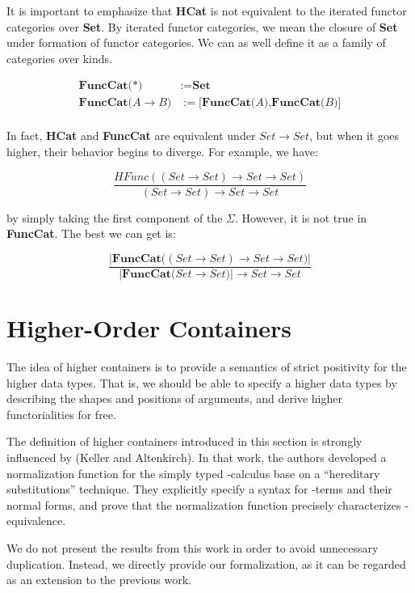 It is important to emphasize that \textbf{HCat} is not equivalent to the iterated functor categories over \textbf{Set}. By iterated functor categories, we mean the closure of \textbf{Set} under formation of functor categories. We can as well define it as a family of categories over kinds.

\begin{align*}
\textbf{FuncCat(} *\textbf{)} & := \textbf{Set} \\
\textbf{FuncCat(} A \to B \textbf{)} & := \textbf{[FuncCat(} A \textbf{),FuncCat(} B \textbf{)]} \\
\end{align*}

In fact, \textbf{HCat} and \textbf{FuncCat} are equivalent under $Set \to Set$, but when it goes higher, their behavior begins to diverge. For example, we have:

\[ \frac{HFunc((Set \to Set) \to Set \to Set)}{(Set \to Set) \to Set \to Set} \]

by simply taking the first component of the $\Sigma$. However, it is not true in \textbf{FuncCat}. The best we can get is:

\[ \frac{\lvert\textbf{FuncCat(} (Set \to Set) \to Set \to Set \textbf{)}\rvert}
  {\lvert\textbf{FuncCat(} Set \to Set \textbf{)}\rvert \to Set \to Set}
\]

\section{Higher-Order Containers}

The idea of higher containers is to provide a semantics of strict positivity for the higher data types. That is, we should be able to specify a higher data types by describing the shapes and positions of arguments, and derive higher functorialities for free. 

The definition of higher containers introduced in this section is strongly influenced by (Keller and Altenkirch)\cite{keller2010normalization}. In that work, the authors developed a normalization function for the simply typed \lambda-calculus base on a ``hereditary substitutions'' technique. They explicitly specify a syntax for \lambda-terms and their normal forms, and prove that the normalization function precisely characterizes \beta\eta-equivalence.

We do not present the results from this work in order to avoid unnecessary duplication. Instead, we directly provide our formalization, as it can be regarded as an extension to the previous work.

